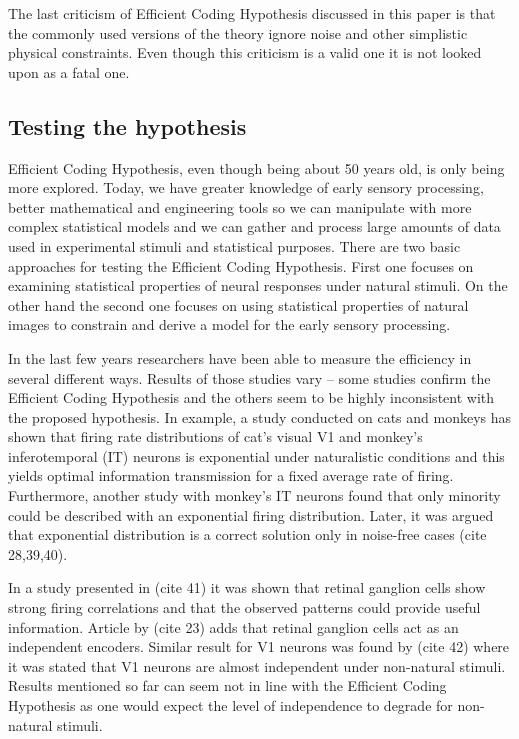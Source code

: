 \documentclass[twoside]{article}
\begin{document}
\begin{multicols}{2}
The last criticism of Efficient Coding Hypothesis discussed in this paper is that the commonly used versions of the theory ignore noise and other simplistic physical constraints. Even though this criticism is a valid one it is not looked upon as a fatal one. 

\subsection{Testing the hypothesis}

Efficient Coding Hypothesis, even though being about 50 years old, is only being more explored. Today, we have greater knowledge of early sensory processing, better mathematical and engineering tools so we can manipulate with more complex statistical models and we can gather and process large amounts of data used in experimental stimuli and statistical purposes. 
There are two basic approaches for testing the Efficient Coding Hypothesis. First one focuses on examining statistical properties of neural responses under natural stimuli. On the other hand the second one focuses on using statistical properties of natural images to constrain and derive a model for the early sensory processing.

In the last few years researchers have been able to measure the efficiency in several different ways. Results of those studies vary – some studies confirm the Efficient Coding Hypothesis and the others seem to be highly inconsistent with the proposed hypothesis.  In example, a study conducted on cats and monkeys has shown that firing rate distributions of cat's visual V1 and monkey's inferotemporal (IT) neurons is exponential under naturalistic conditions and this yields optimal information transmission for a fixed average rate of firing. Furthermore, another study with monkey's IT neurons found that only minority could be described with an exponential firing distribution. Later, it was argued that exponential distribution is a correct solution only in noise-free cases (cite 28,39,40). 

In a study presented in (cite 41) it was shown that retinal ganglion cells show strong firing correlations and that the observed patterns could provide useful information.  Article by (cite 23) adds that retinal ganglion cells act as an independent encoders. Similar result for V1 neurons was found by (cite 42) where it was stated that V1 neurons are almost independent under non-natural stimuli. Results mentioned so far can seem not in line with the Efficient Coding Hypothesis as one would expect the level of independence to degrade for non-natural stimuli. 


\end{multicols}
\end{document}
